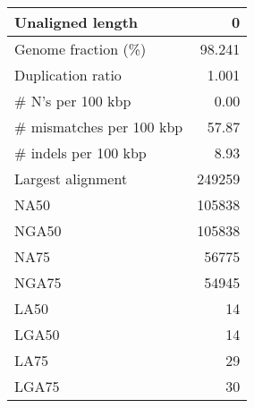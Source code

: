 \documentclass[12pt,a4paper]{article}
\begin{document}
\begin{table}[ht]
\begin{center}
\begin{tabular}{|l*{1}{|r}|}
Unaligned length & 0 \\ \hline
Genome fraction (\%) & 98.241 \\ \hline
Duplication ratio & 1.001 \\ \hline
\# N's per 100 kbp & 0.00 \\ \hline
\# mismatches per 100 kbp & 57.87 \\ \hline
\# indels per 100 kbp & 8.93 \\ \hline
Largest alignment & 249259 \\ \hline
NA50 & 105838 \\ \hline
NGA50 & 105838 \\ \hline
NA75 & 56775 \\ \hline
NGA75 & 54945 \\ \hline
LA50 & 14 \\ \hline
LGA50 & 14 \\ \hline
LA75 & 29 \\ \hline
LGA75 & 30 \\ \hline
\end{tabular}
\end{center}
\end{table}
\end{document}
